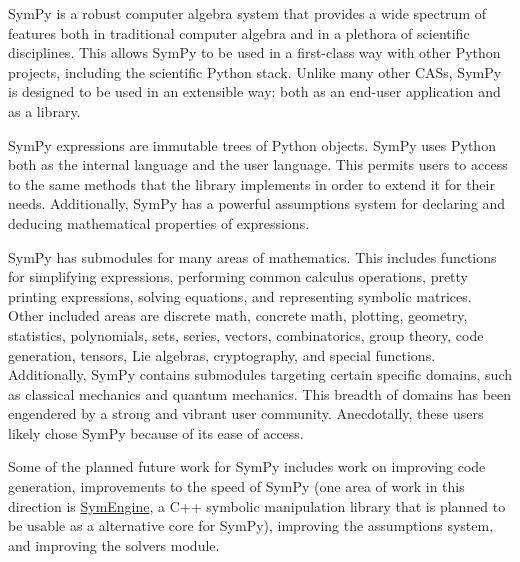 SymPy is a robust computer algebra system that provides a wide spectrum of
features both in traditional computer algebra and in a plethora of scientific
disciplines. This allows SymPy to be used in a first-class way with other
Python projects, including the scientific Python stack. Unlike many other CASs, SymPy
is designed to be used in an extensible way: both as an end-user
application and as a library.

SymPy expressions are immutable trees of Python objects. SymPy uses Python both
as the internal language and the user language. This permits users to access to
the same
methods that the library implements in order to extend it for their needs.
Additionally, SymPy has a powerful assumptions
system for declaring and deducing mathematical properties of expressions.

SymPy has submodules for many areas of mathematics. This includes functions for
simplifying expressions, performing common calculus operations, pretty printing
expressions, solving equations, and representing symbolic matrices. Other included
areas
are discrete math, concrete math, plotting, geometry, statistics,
polynomials, sets, series, vectors, combinatorics, group theory, code
generation, tensors, Lie algebras, cryptography, and special functions.
Additionally, SymPy contains submodules targeting certain specific domains,
such as classical mechanics and quantum mechanics.  This breadth of domains has
been engendered by a strong and vibrant user community.
Anecdotally, these users likely chose SymPy because of its ease of access.


Some of the planned future work for SymPy includes work on improving code
generation, improvements to the speed of SymPy (one area of work in this
direction is \href{https://github.com/symengine/symengine}{SymEngine}, a
C++ symbolic manipulation library that is planned to be usable as a
alternative core for SymPy), improving the assumptions system, and improving the
solvers module.


